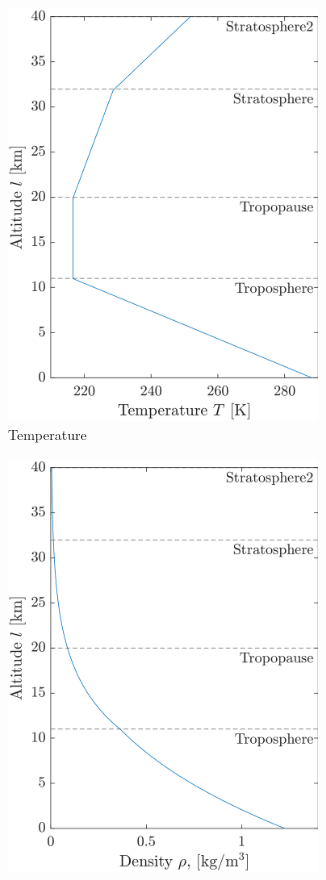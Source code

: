 \begin{figure}[ht]
\begin{subfigure}{0.32\textwidth}
        \includegraphics[width=0.9\textwidth]{images-design/model_atmosphere-temperature.png}
        \caption{Temperature}
        \label{fig:atmos-temperature}
    \end{subfigure}
    \begin{subfigure}{0.32\textwidth}
        \includegraphics[width=0.9\textwidth]{images-design/model_atmosphere-density.png}

\end{subfigure}
\end{figure}
